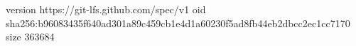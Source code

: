 version https://git-lfs.github.com/spec/v1
oid sha256:b96083435f640ad301a89c459cb1e4d1a60230f5ad8fb44eb2dbcc2ec1cc7170
size 363684
